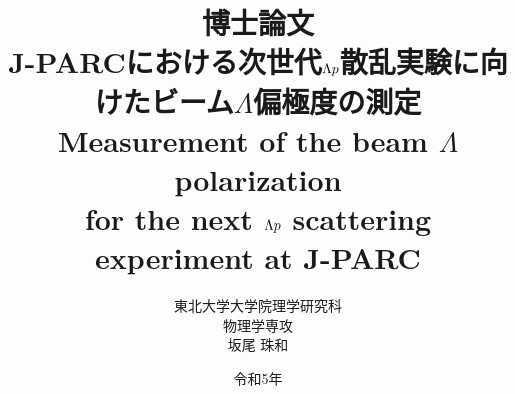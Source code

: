 %

\title{
博士論文 \\
\vspace{30pt}
J-PARCにおける次世代$\Lambda p$散乱実験に向けたビーム$\Lambda$偏極度の測定\\
\vspace{30pt}
Measurement of the beam $\Lambda$ polarization \\for the next $\Lambda p$ scattering experiment at J-PARC\\
}

\author{東北大学大学院理学研究科 \\ \vspace{20pt} 物理学専攻 \\ \vspace{20pt} 坂尾 珠和}
\date{令和5年}
\maketitle
\thispagestyle{empty}
%
